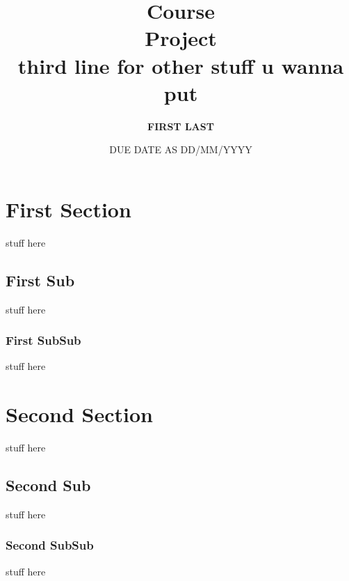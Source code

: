 \documentclass{article}
\begin{document}
\title{ \textbf{{}  Course} \\ Project \\ third line for other stuff u wanna put}
\author{\textbf{FIRST LAST}}
\date{DUE DATE AS DD/MM/YYYY}
\maketitle

\newpage
\tableofcontents
\newpage

\section{First Section}
stuff here

\subsection{First Sub}
stuff here

\subsubsection{First SubSub}
stuff here

\newpage
\section{Second Section}
stuff here

\subsection{Second Sub}
stuff here

\subsubsection{Second SubSub}
stuff here
\end{document}
